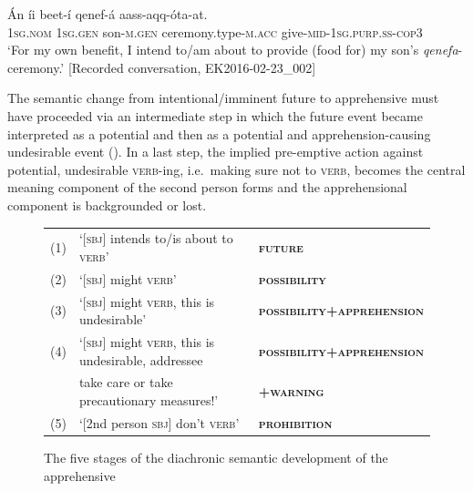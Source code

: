 \documentclass[output=paper,colorlinks,citecolor=brown,
]{langsci/langscibook}
\begin{document}
\ea\label{ex:treis:33}
\gll Án			íi			beet-í			qenef-á aass-aqq-óta-at. \\
\textsc{1sg.nom} \textsc{1sg.gen}	son-\textsc{m.gen}	ceremony.type-\textsc{m.acc} give-\textsc{mid-1sg.purp.ss-cop3}\\
\glt `For my own benefit, I intend to/am about to provide (food for) my son's \textit{qenefa}-ceremony.' [Recorded conversation, EK2016-02-23\_002]
\z

The semantic change from intentional/imminent future to apprehensive must have proceeded via an intermediate step in which the future event became interpreted as a potential and then as a potential and apprehension-causing undesirable event (). In a last step, the implied pre-emptive action against potential, undesirable \textsc{verb}-ing,  i.e.\ making sure not to \textsc{verb}, becomes the central meaning component of the second person forms and the apprehensional component is backgrounded or lost. 

\begin{figure}[ht]
\small%
\begin{tabular}{@{} lll @{}} 
(1) & `[\textsc{sbj}] intends to/is about to \textsc{verb}'&\textbf{\textsc{future}}\\
(2) & `[\textsc{sbj}] might \textsc{verb}' & \textbf{\textsc{possibility}}\\
(3) & `[\textsc{sbj}] might \textsc{verb}, this is undesirable'&\textbf{\textsc{possibility+apprehension}}\\
(4) & `[\textsc{sbj}] might \textsc{verb}, this is undesirable, addressee & \textbf{\textsc{possibility+apprehension}}\\
& \hspace{.5cm} take care or take precautionary measures!' & \hspace{.5cm}\textbf{\textsc{+warning}}\\
(5) & `[2nd person \textsc{sbj}] don't \textsc{verb}' &  \textbf{\textsc{prohibition}}
\end{tabular}
\caption{The five stages of the diachronic semantic development of the apprehensive}
\label{fig:treis:6}
\end{figure}

\end{document}
